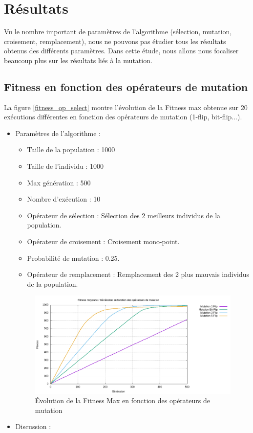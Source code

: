 \documentclass[12pt]{article}
\begin{document}
\section{Résultats}
\label{resultat_1}
Vu le nombre important de paramètres de l'algorithme (sélection, mutation, croisement, remplacement), nous ne pouvons pas étudier tous les résultats obtenus des différents paramètres. Dans cette étude, nous allons nous focaliser beaucoup plus sur les résultats liés à la mutation.

\subsection{Fitness en fonction des opérateurs de mutation} La figure \ref{fitness_op_select} montre l'évolution de la Fitness max obtenue sur 20 exécutions différentes en fonction des opérateurs de mutation (1-flip, bit-flip...).
\begin{itemize}
\item{Paramètres de l'algorithme :}
	\begin{itemize}[label=-]
		\item{Taille de la population : } 1000
		\item{Taille de l'individu :} 1000
		\item{Max génération :} 500
		\item{Nombre d'exécution :} 10
		\item{Opérateur de sélection :} Sélection des 2 meilleurs individus de la population.
		\item{Opérateur de croisement :} Croisement mono-point.
		\item{Probabilité de mutation :} 0.25.
		\item{Opérateur de remplacement :} Remplacement des 2 plus mauvais individus de la population.
		\label{param_algo_1}
	\end{itemize} 

\begin{figure}[H]
		\begin{center}
			\includegraphics[scale=0.5]{img/fitness_op_mut.png}
			\caption{Évolution de la Fitness Max en fonction des opérateurs de mutation}
			\label{fitness_op_mut}
		\end{center}
\end{figure}

\item{Discussion :}

\end{itemize}
\end{document}
